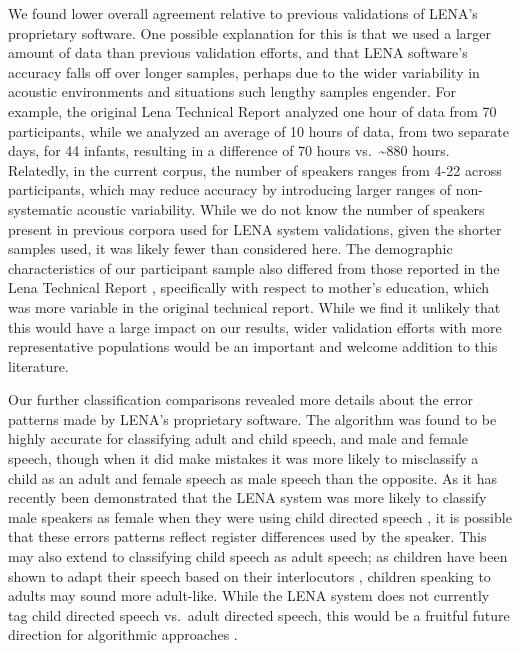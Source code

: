 \documentclass[man,floatsintext]{apa6}
\theoremstyle{definition}
\theoremstyle{definition}
\theoremstyle{definition}
\theoremstyle{remark}
\begin{document}
We found lower overall agreement relative to previous validations of
LENA's proprietary software. One possible explanation for this is that
we used a larger amount of data than previous validation efforts, and
that LENA software's accuracy falls off over longer samples, perhaps due
to the wider variability in acoustic environments and situations such
lengthy samples engender. For example, the original Lena Technical
Report \citep{Xu2008} analyzed one hour of data from 70 participants,
while we analyzed an average of 10 hours of data, from two separate
days, for 44 infants, resulting in a difference of 70 hours
vs.~\textasciitilde880 hours. Relatedly, in the current corpus, the
number of speakers ranges from 4-22 across participants, which may
reduce accuracy by introducing larger ranges of non-systematic acoustic
variability. While we do not know the number of speakers present in
previous corpora used for LENA system validations, given the shorter
samples used, it was likely fewer than considered here. The demographic
characteristics of our participant sample also differed from those
reported in the Lena Technical Report \citep{Xu2009}, specifically with
respect to mother's education, which was more variable in the original
technical report. While we find it unlikely that this would have a large
impact on our results, wider validation efforts with more representative
populations would be an important and welcome addition to this
literature.

Our further classification comparisons revealed more details about the
error patterns made by LENA's proprietary software. The algorithm was
found to be highly accurate for classifying adult and child speech, and
male and female speech, though when it did make mistakes it was more
likely to misclassify a child as an adult and female speech as male
speech than the opposite. As it has recently been demonstrated that the
LENA system was more likely to classify male speakers as female when
they were using child directed speech \citep{BergelsonCasillas}, it is
possible that these errors patterns reflect register differences used by
the speaker. This may also extend to classifying child speech as adult
speech; as children have been shown to adapt their speech based on their
interlocutors \citep{Syrett2014, Tomasello1984}, children speaking to
adults may sound more adult-like. While the LENA system does not
currently tag child directed speech vs.~adult directed speech, this
would be a fruitful future direction for algorithmic approaches
\citep[cf.~][]{Schuster2014}.
\end{document}

